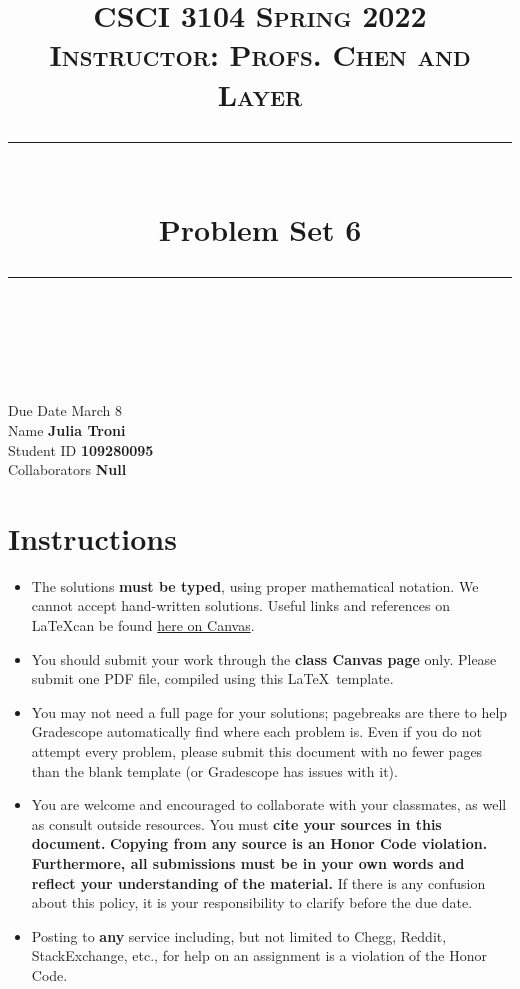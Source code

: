 \documentclass[11pt]{article}
\title{
\normalfont \normalsize 
\textsc{CSCI 3104 Spring 2022 \\ 
Instructor: Profs. Chen and Layer} \\
[10pt] 
\rule{\linewidth}{0.5pt} \\[6pt] 
\huge Problem Set 6 \\
\rule{\linewidth}{2pt}  \\[10pt]
}
\date{}
\theoremstyle{definition}
\theoremstyle{definition}
\theoremstyle{definition}
\begin{document}
\maketitle


\noindent
Due Date \dotfill March 8 \\
Name \dotfill \textbf{Julia Troni} \\
Student ID \dotfill \textbf{109280095} \\
Collaborators \dotfill \textbf{Null}

\tableofcontents

\section*{Instructions}
 \begin{itemize}
	\item The solutions \textbf{must be typed}, using proper mathematical notation. We cannot accept hand-written solutions. Useful links and references on \LaTeX can be found \href{https://canvas.colorado.edu/courses/75824/pages/latex}{here on Canvas}.
	\item You should submit your work through the \textbf{class Canvas page} only. Please submit one PDF file, compiled using this \LaTeX \ template.
	\item You may not need a full page for your solutions; pagebreaks are there to help Gradescope automatically find where each problem is. Even if you do not attempt every problem, please submit this document with no fewer pages than the blank template (or Gradescope has issues with it).

	\item You are welcome and encouraged to collaborate with your classmates, as well as consult outside resources. You must \textbf{cite your sources in this document.} \textbf{Copying from any source is an Honor Code violation. Furthermore, all submissions must be in your own words and reflect your understanding of the material.} If there is any confusion about this policy, it is your responsibility to clarify before the due date. 

	\item Posting to \textbf{any} service including, but not limited to Chegg, Reddit, StackExchange, etc., for help on an assignment is a violation of the Honor Code.
\end{itemize}
\end{document}
